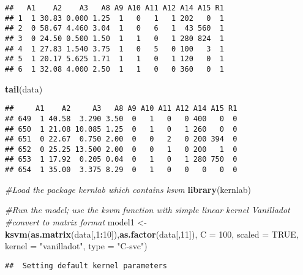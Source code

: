 \documentclass[
]{article}
\newenvironment{Shaded}{\begin{snugshade}}{\end{snugshade}}
\newcommand{\AttributeTok}[1]{\textcolor[rgb]{0.13,0.29,0.53}{#1}}
\newcommand{\CommentTok}[1]{\textcolor[rgb]{0.56,0.35,0.01}{\textit{#1}}}
\newcommand{\ConstantTok}[1]{\textcolor[rgb]{0.56,0.35,0.01}{#1}}
\newcommand{\DecValTok}[1]{\textcolor[rgb]{0.00,0.00,0.81}{#1}}
\newcommand{\FunctionTok}[1]{\textcolor[rgb]{0.13,0.29,0.53}{\textbf{#1}}}
\newcommand{\NormalTok}[1]{#1}
\newcommand{\OtherTok}[1]{\textcolor[rgb]{0.56,0.35,0.01}{#1}}
\newcommand{\SpecialCharTok}[1]{\textcolor[rgb]{0.81,0.36,0.00}{\textbf{#1}}}
\newcommand{\StringTok}[1]{\textcolor[rgb]{0.31,0.60,0.02}{#1}}
\begin{document}
\begin{verbatim}
##   A1    A2    A3   A8 A9 A10 A11 A12 A14 A15 R1
## 1  1 30.83 0.000 1.25  1   0   1   1 202   0  1
## 2  0 58.67 4.460 3.04  1   0   6   1  43 560  1
## 3  0 24.50 0.500 1.50  1   1   0   1 280 824  1
## 4  1 27.83 1.540 3.75  1   0   5   0 100   3  1
## 5  1 20.17 5.625 1.71  1   1   0   1 120   0  1
## 6  1 32.08 4.000 2.50  1   1   0   0 360   0  1
\end{verbatim}

\begin{Shaded}
\begin{Highlighting}[]
\FunctionTok{tail}\NormalTok{(data)}
\end{Highlighting}
\end{Shaded}

\begin{verbatim}
##     A1    A2     A3   A8 A9 A10 A11 A12 A14 A15 R1
## 649  1 40.58  3.290 3.50  0   1   0   0 400   0  0
## 650  1 21.08 10.085 1.25  0   1   0   1 260   0  0
## 651  0 22.67  0.750 2.00  0   0   2   0 200 394  0
## 652  0 25.25 13.500 2.00  0   0   1   0 200   1  0
## 653  1 17.92  0.205 0.04  0   1   0   1 280 750  0
## 654  1 35.00  3.375 8.29  0   1   0   0   0   0  0
\end{verbatim}

\begin{Shaded}
\begin{Highlighting}[]
\CommentTok{\#Load the package kernlab which contains ksvm}
\FunctionTok{library}\NormalTok{(kernlab)}
\end{Highlighting}
\end{Shaded}

\begin{Shaded}
\begin{Highlighting}[]
\CommentTok{\#Run the model; use the ksvm function with simple linear kernel Vanilladot}
\CommentTok{\#convert to matrix format }
\NormalTok{model1 }\OtherTok{\textless{}{-}} \FunctionTok{ksvm}\NormalTok{(}\FunctionTok{as.matrix}\NormalTok{(data[,}\DecValTok{1}\SpecialCharTok{:}\DecValTok{10}\NormalTok{]),}\FunctionTok{as.factor}\NormalTok{(data[,}\DecValTok{11}\NormalTok{]), }\AttributeTok{C =} \DecValTok{100}\NormalTok{, }\AttributeTok{scaled =} \ConstantTok{TRUE}\NormalTok{, }\AttributeTok{kernel =} \StringTok{"vanilladot"}\NormalTok{, }\AttributeTok{type =} \StringTok{"C{-}svc"}\NormalTok{)}
\end{Highlighting}
\end{Shaded}

\begin{verbatim}
##  Setting default kernel parameters
\end{verbatim}
\end{document}

